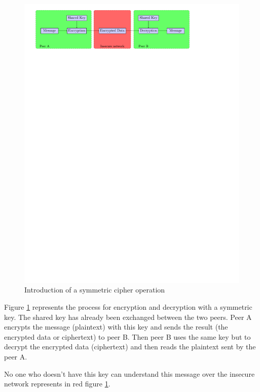 \begin{figure}[!ht]
\centering
\includegraphics[trim=1cm 23.25cm 4cm 0cm]{figures/sym_cipher.pdf}
\caption{Introduction of a symmetric cipher operation}
\label{fig:sym}

\end{figure}

Figure \ref{fig:sym} represents the process for encryption and decryption with a
symmetric key.
The shared key has already been exchanged between the two peers.\newline
Peer A encrypts the message (plaintext) with this key and sends the result (the
encrypted data or ciphertext) to peer B.\newline
Then peer B uses the same key but to decrypt the encrypted data (ciphertext) and
then reads the plaintext sent by the peer A.\newline

No one who doesn't have this key can understand this message over the insecure
network represents in red figure \ref{fig:sym}.

